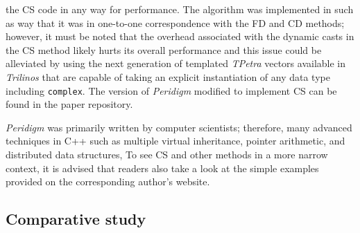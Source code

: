 \documentclass[preprint,12pt]{elsarticle}
\begin{document}
the CS code in any way for performance. The algorithm  was implemented in such
as way that it was in one-to-one correspondence with the FD and CD methods;
however, it must be noted that the overhead associated with the dynamic casts
in the CS method likely hurts its overall performance and this issue could be
alleviated by using the next generation of templated \emph{TPetra} vectors
available in \emph{Trilinos} that are capable of taking an explicit
instantiation of any data type including {\tt complex}.  The version of \emph{Peridigm}
modified to implement CS can be found in the paper repository.  

\emph{Peridigm} was primarily written by computer scientists; therefore,
many advanced techniques in C++ such as multiple virtual inheritance, pointer
arithmetic, and distributed data structures,  To see CS and other methods in a more narrow context,
it is advised that readers also take a look at the simple examples provided on
the corresponding author's website.

\subsection{Comparative study} 
\label{tcs}
\end{document}
